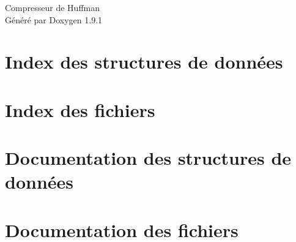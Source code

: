 \let\mypdfximage\pdfximage\def\pdfximage{\immediate\mypdfximage}\documentclass[twoside]{book}
\newcommand{\+}{\discretionary{\mbox{\scriptsize$\hookleftarrow$}}{}{}}
\newcommand{\clearemptydoublepage}{%
  \newpage{\pagestyle{empty}\cleardoublepage}%
}
\begin{document}
\raggedbottom

\hypersetup{pageanchor=false,
             bookmarksnumbered=true,
             pdfencoding=unicode
            }
\begin{titlepage}
\vspace*{7cm}
\begin{center}%
{\Large Compresseur de Huffman }\\
\vspace*{1cm}
{\large Généré par Doxygen 1.9.1}\\
\end{center}
\end{titlepage}
\clearemptydoublepage
{}
\tableofcontents
\clearemptydoublepage
{}
\hypersetup{pageanchor=true}

\chapter{Index des structures de données}

\chapter{Index des fichiers}

\chapter{Documentation des structures de données}









\chapter{Documentation des fichiers}









\backmatter
\newpage
{}
\clearemptydoublepage
{}
\printindex
\end{document}
